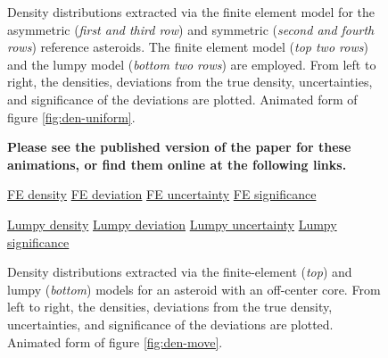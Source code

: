 \begin{figure}
  \caption{Density distributions extracted via the finite element model for the asymmetric (\textit{first and third row}) and symmetric (\textit{second and fourth rows}) reference asteroids. The finite element model (\textit{top two rows}) and the lumpy model (\textit{bottom two rows}) are employed. From left to right, the densities, deviations from the true density, uncertainties, and significance of the deviations are plotted. Animated form of figure \ref{fig:den-uniform}.}
  \label{fig:animated-uniform}
\end{figure}

\begin{figure}
  \textbf{Please see the published version of the paper for these animations, or find them online at the following links.}

  \href{https://github.com/jack-dinsmore/asteroid-tidal-torque/tree/main/paper/gifs/move-fe-d.gif}{FE density} \hfill
  \href{https://github.com/jack-dinsmore/asteroid-tidal-torque/tree/main/paper/gifs/move-fe-s.gif}{FE deviation} \hfill
  \href{https://github.com/jack-dinsmore/asteroid-tidal-torque/tree/main/paper/gifs/move-fe-u.gif}{FE uncertainty} \hfill
  \href{https://github.com/jack-dinsmore/asteroid-tidal-torque/tree/main/paper/gifs/move-fe-r.gif}{FE significance}

  \href{https://github.com/jack-dinsmore/asteroid-tidal-torque/tree/main/paper/gifs/move-l-d.gif}{Lumpy density} \hfill
  \href{https://github.com/jack-dinsmore/asteroid-tidal-torque/tree/main/paper/gifs/move-l-s.gif}{Lumpy deviation} \hfill
  \href{https://github.com/jack-dinsmore/asteroid-tidal-torque/tree/main/paper/gifs/move-l-u.gif}{Lumpy uncertainty} \hfill
  \href{https://github.com/jack-dinsmore/asteroid-tidal-torque/tree/main/paper/gifs/move-l-r.gif}{Lumpy significance}

  \caption{Density distributions extracted via the finite-element (\textit{top}) and lumpy (\textit{bottom}) models for an asteroid with an off-center core. From left to right, the densities, deviations from the true density, uncertainties, and significance of the deviations are plotted. Animated form of figure \ref{fig:den-move}.}
  \label{fig:animated-move}
\end{figure}

